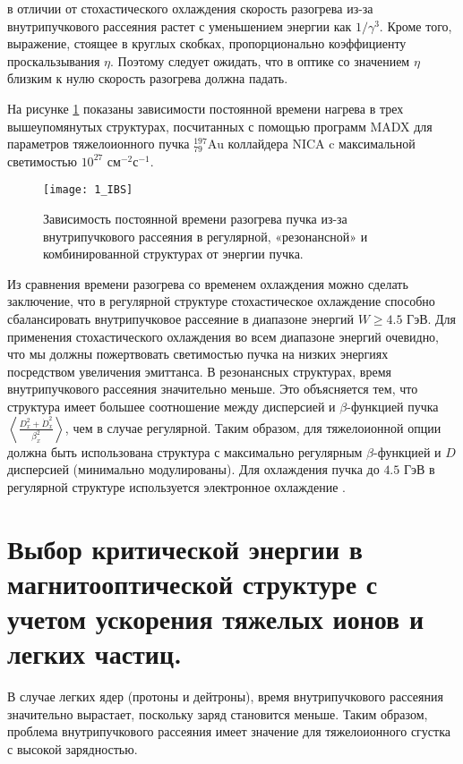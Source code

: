 \noindent в отличии от стохастического охлаждения скорость разогрева из-за внутрипучкового рассеяния растет с уменьшением энергии как $1/\gamma^3$. Кроме того, выражение, стоящее в круглых скобках, пропорционально коэффициенту проскальзывания $\eta$. Поэтому следует ожидать, что в оптике со значением $\eta$ близким к нулю скорость разогрева должна падать. 

\noindent На рисунке \ref{fig:1_IBS} показаны зависимости постоянной времени нагрева в трех вышеупомянутых структурах, посчитанных с помощью программ MADX \cite{madx, antoniou:ibs} для параметров тяжелоионного пучка ${_{79}^{197}}\textrm{Au}$ коллайдера NICA c максимальной светимостью ${10}^{27}$ см$^{-2}$с$^{-1}$.

\begin{figure}[!h]
  \centering
   \texttt{[image: 1\_IBS]}
   \caption{Зависимость постоянной времени разогрева пучка из-за внутрипучкового рассеяния в регулярной, «резонансной» и комбинированной структурах от энергии пучка.}
   \label{fig:1_IBS}
\end{figure}

\noindent Из сравнения времени разогрева со временем охлаждения можно сделать заключение, что в регулярной структуре стохастическое охлаждение способно сбалансировать внутрипучковое рассеяние в диапазоне энергий $W\geq4.5$ ГэВ. Для применения стохастического охлаждения во всем диапазоне энергий очевидно, что мы должны пожертвовать светимостью пучка на низких энергиях посредством увеличения эмиттанса. В резонансных структурах, время внутрипучкового рассеяния значительно меньше. Это объясняется тем, что структура имеет большее соотношение между дисперсией и $\beta$-функцией пучка $\left\langle\frac{D_x^2+{\dot{D}}_x^2}{\beta_x^2}\right\rangle$, чем в случае регулярной. Таким образом, для тяжелоионной опции должна быть использована структура с максимально регулярным $\beta$-функцией и $D$ дисперсией (минимально модулированы). Для охлаждения пучка до $4.5$ ГэВ в регулярной структуре используется электронное охлаждение \cite{kostromin:stochastic}.

\section{Выбор критической энергии в магнитооптической структуре с учетом ускорения тяжелых ионов и легких частиц.}\label{sec:ch:ions_light/transition}

\par В случае легких ядер (протоны и дейтроны), время внутрипучкового рассеяния значительно вырастает, поскольку заряд становится меньше. Таким образом, проблема внутрипучкового рассеяния имеет значение для тяжелоионного сгустка с высокой зарядностью.

